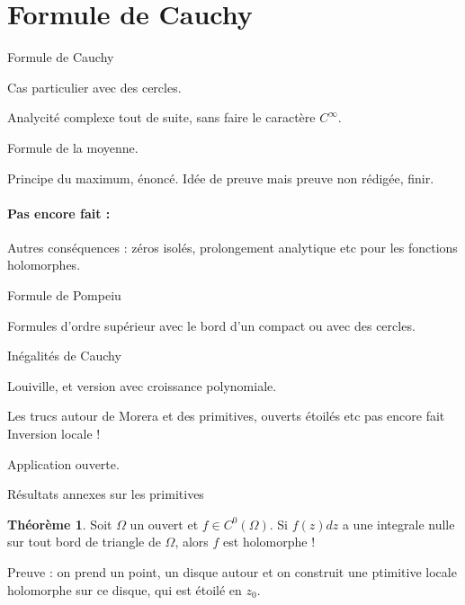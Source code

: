 \documentclass[11pt,a4paper]{book}
\theoremstyle{definition}
\newtheorem{theoreme}{Th\'eor\`eme}[section]
\theoremstyle{plain}
\begin{document}





\section{Formule de Cauchy}

Formule de Cauchy


Cas particulier avec des cercles.

Analycité complexe tout de suite, sans faire le caractère $C^\infty$.

Formule de la moyenne. 

Principe du maximum, énoncé. Idée de preuve mais preuve non rédigée, finir.


 \paragraph{Pas encore fait : }
 
 Autres conséquences : zéros isolés, prolongement analytique etc pour les fonctions holomorphes.
 
 Formule de Pompeiu

Formules d'ordre supérieur avec le bord d'un compact ou avec des cercles.

Inégalités de Cauchy




Louiville, et version avec croissance  polynomiale.

Les trucs autour de Morera et des primitives, ouverts étoilés etc pas encore fait
Inversion locale ! 

Application ouverte.

Résultats annexes sur les primitives


\begin{theoreme}
Soit $\Omega$ un ouvert et $f \in C^0(\Omega)$.
Si $f(z)dz$ a une integrale nulle sur tout bord de triangle de $\Omega$, alors $f$ est holomorphe !
\end{theoreme}

Preuve : on prend un point, un disque autour et on construit une ptimitive locale holomorphe sur ce disque, qui est étoilé en $z_0$.
\end{document}
